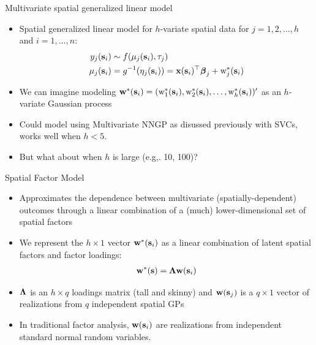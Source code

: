\begin{frame}{Multivariate spatial generalized linear model}

\begin{itemize}
    \item Spatial generalized linear model for $h$-variate spatial data for $j = 1, 2, \dots, h$ and $i = 1, \dots, n$: 
    \begin{align*}
	    y_j(\textbf{s}_i) &\sim f(\mu_j(\textbf{s}_i), \tau_j) \\
	    \mu_j(\textbf{s}_i) &= g^{-1}(\eta_j(\textbf{s}_i)) = \textbf{x}(\textbf{s}_i)^\top\mbox{\boldmath $ \beta $}_j + \text{w}^\ast_j(\textbf{s}_i)
    \end{align*}
    \item We can imagine modeling $\textbf{w}^\ast(\textbf{s}_i) = (\text{w}^\ast_1(\textbf{s}_i), \text{w}^\ast_2(\textbf{s}_i), \ldots, \text{w}^\ast_h(\textbf{s}_i))'$ as an $h$-variate Gaussian process \pause
    \item Could model using Multivariate NNGP as disussed previously with SVCs, works well when $h < 5$. \pause
    \item But what about when $h$ is large (e.g,. 10, 100)?
\end{itemize}
\end{frame}

\begin{frame}{Spatial Factor Model}
    \begin{itemize}
    \item Approximates the dependence between multivariate (spatially-dependent) outcomes through a linear combination of a (much) lower-dimensional set of spatial factors \pause
    \item We represent the $h \times 1$ vector $\textbf{w}^\ast(\textbf{s}_i)$ as a linear combination of latent spatial factors and factor loadings: 
	    \begin{align*}
                 \textbf{w}^\ast(\textbf{s}) = \mbox{\boldmath $\Lambda$}\textbf{w}(\textbf{s}_i)
	    \end{align*}
    \item $\mbox{\boldmath $\Lambda$}$ is an $h \times q$ loadings matrix (tall and skinny) and $\textbf{w}(\textbf{s}_j)$ is a $q \times 1$ vector of realizations from $q$ independent spatial GPs \pause
    \item In traditional factor analysis, $\textbf{w}(\textbf{s}_i)$ are realizations from independent standard normal random variables.
    \end{itemize}
\end{frame}

